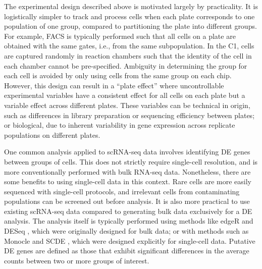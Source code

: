 \documentclass[oupdraft]{bio}
\begin{document}
The experimental design described above is motivated largely by practicality.
It is logistically simpler to track and process cells when each plate corresponds to one population of one group, compared to partitioning the plate into different groups.
For example, FACS is typically performed such that all cells on a plate are obtained with the same gates, i.e., from the same subpopulation.
In the C1, cells are captured randomly in reaction chambers such that the identity of the cell in each chamber cannot be pre-specified.
Ambiguity in determining the group for each cell is avoided by only using cells from the same group on each chip.
However, this design can result in a ``plate effect'' where uncontrollable experimental variables have a consistent effect for all cells on each plate but a variable effect across different plates. 
These variables can be technical in origin, such as differences in library preparation or sequencing efficiency between plates; 
    or biological, due to inherent variability in gene expression across replicate populations on different plates.


One common analysis applied to scRNA-seq data involves identifying DE genes between groups of cells.
This does not strictly require single-cell resolution, and is more conventionally performed with bulk RNA-seq data.
Nonetheless, there are some benefits to using single-cell data in this context.
Rare cells are more easily sequenced with single-cell protocols, and irrelevant cells from contaminating populations can be screened out before analysis.
It is also more practical to use existing scRNA-seq data compared to generating bulk data exclusively for a DE analysis.
The analysis itself is typically performed using methods like edgeR \citep{robinson2010edgeR} and DESeq \citep{anders2010differential}, which were originally designed for bulk data;
    or with methods such as Monocle \citep{trapnell2014dynamics} and SCDE \citep{kharchenko2014bayesian}, which were designed explicitly for single-cell data.
Putative DE genes are defined as those that exhibit significant differences in the average counts between two or more groups of interest.
\end{document}
